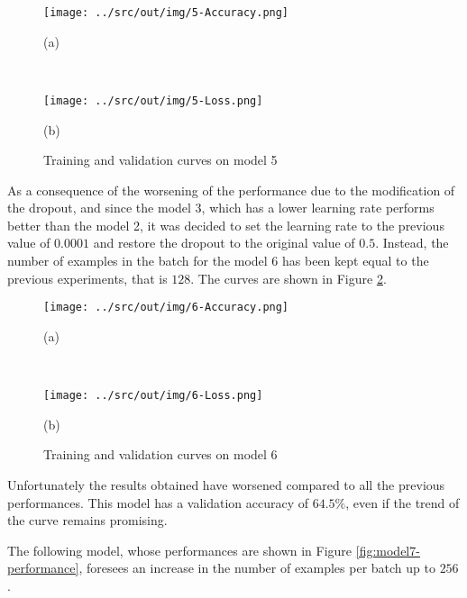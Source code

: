 \documentclass[a4paper,12pt]{article} %
\begin{document}
	\begin{figure}[htb]
		\begin{minipage}[c]{.49\textwidth}
			\centering
			\texttt{[image: ../src/out/img/5-Accuracy.png]}
			\caption*{(a)}
		\end{minipage}
		~
		\begin{minipage}[c]{.49\textwidth}
			\centering
			\texttt{[image: ../src/out/img/5-Loss.png]}
			\caption*{(b)}
		\end{minipage}
		\caption{Training and validation curves on model 5}
		\label{fig:model5-performance}
	\end{figure}

	As a consequence of the worsening of the performance due to the 
	modification of the dropout, and since the model 3, which has a lower 
	learning rate performs better than the model 2, it was decided to set 
	the learning rate to the previous value of $0.0001$ and restore the dropout 
	to the original value of $0.5$. Instead, the number of examples in the 
	batch for the model 6 has been kept equal to the previous experiments, that 
	is $128$. 
	The curves are shown in Figure \ref{fig:model6-performance}.
		
	\begin{figure}[H]
		\begin{minipage}[c]{.49\textwidth}
			\centering
			\texttt{[image: ../src/out/img/6-Accuracy.png]}
			\caption*{(a)}
		\end{minipage}
		~
		\begin{minipage}[c]{.49\textwidth}
			\centering
			\texttt{[image: ../src/out/img/6-Loss.png]}
			\caption*{(b)}
		\end{minipage}
		\caption{Training and validation curves on model 6}
		\label{fig:model6-performance}
	\end{figure}

	Unfortunately the results obtained have worsened compared to all the 
	previous performances. This model has a validation accuracy of $64.5\%$, 
	even if the trend of the curve remains promising.
	\newline
	
	The following model, whose performances are shown in Figure 
	\ref{fig:model7-performance}, foresees an increase in the number of 
	examples per batch up to $256$.
	
\end{document}
